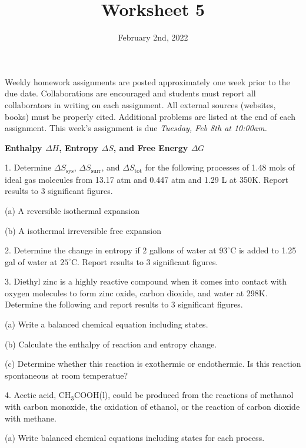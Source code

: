 \documentclass[11pt]{article}
\title{\textbf{Worksheet 5}}
\date{\vspace{-2em}February 2nd, 2022}
\begin{document}
\maketitle

Weekly homework assignments are posted approximately one week prior to the
due date. Collaborations are encouraged and students must report all collaborators
in writing on each assignment. All external sources (websites, books) must be
properly cited. Additional problems are listed at the end of each assignment.
This week's assignment is due \textit{Tuesday, Feb 8th at 10:00am.}

\textbf{Enthalpy $\Delta H$, Entropy $\Delta S$, and Free Energy $\Delta G$}

1. Determine $\Delta S_\text{sys}$, $\Delta S_\text{surr}$, and $\Delta S_\text{tot}$ for the
following processes of 1.48 mols of ideal gas molecules from 13.17 atm and 0.447 atm
and 1.29 L at 350K. Report results to 3 significant figures.

(a) A reversible isothermal expansion

(b) A isothermal irreversible free expansion

\vspace{2.5in}

2. Determine the change in entropy if 2 gallons of water at $93^\circ\text{C}$ is added to
1.25 gal of water at $25^\circ\text{C}$. Report results to 3 significant figures.

\vspace{2.5in}

3. Diethyl zinc is a highly reactive compound when it comes into contact with oxygen molecules
to form zinc oxide, carbon dioxide, and water at 298K. Determine the following and report results
to 3 significant figures.

(a) Write a balanced chemical equation including states.

(b) Calculate the enthalpy of reaction and entropy change.

(c) Determine whether this reaction is exothermic or endothermic. Is this reaction spontaneous
at room temperatue?

\vspace{2.5in}

4. Acetic acid, CH$_3$COOH(l), could be produced from the reactions of methanol with carbon monoxide,
the oxidation of ethanol, or the reaction of carbon dioxide with methane.

(a) Write balanced chemical equations including states for each process.
\end{document}
